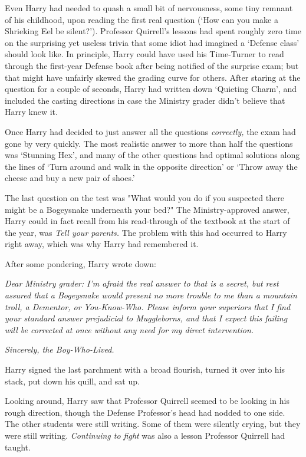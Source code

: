 Even Harry had needed to quash a small bit of nervousness, some tiny remnant of
his childhood, upon reading the first real question (`How can you make a
Shrieking Eel be silent?'). Professor Quirrell's lessons had spent roughly zero
time on the surprising yet useless trivia that some idiot had imagined a
`Defense class' should look like. In principle, Harry could have used his
Time-Turner to read through the first-year Defense book after being notified of
the surprise exam; but that might have unfairly skewed the grading curve for
others. After staring at the question for a couple of seconds, Harry had
written down `Quieting Charm', and included the casting directions in case the
Ministry grader didn't believe that Harry knew it.

Once Harry had decided to just answer all the questions \emph{correctly,} the
exam had gone by very quickly. The most realistic answer to more than half the
questions was `Stunning Hex', and many of the other questions had optimal
solutions along the lines of `Turn around and walk in the opposite direction'
or `Throw away the cheese and buy a new pair of shoes.'

The last question on the test was "What would you do if you suspected there
might be a Bogeysnake underneath your bed?" The Ministry-approved answer, Harry
could in fact recall from his read-through of the textbook at the start of the
year, was \emph{Tell your parents.} The problem with this had occurred to Harry
right away, which was why Harry had remembered it.

After some pondering, Harry wrote down:

\emph{Dear Ministry grader: I'm afraid the real answer to that is a secret, but
rest assured that a Bogeysnake would present no more trouble to me than a
mountain troll, a Dementor, or You-Know-Who. Please inform your superiors that
I find your standard answer prejudicial to Muggleborns, and that I expect this
failing will be corrected at once without any need for my direct intervention.}

\emph{Sincerely, the Boy-Who-Lived.}

Harry signed the last parchment with a broad flourish, turned it over into his
stack, put down his quill, and sat up.

Looking around, Harry saw that Professor Quirrell seemed to be looking in his
rough direction, though the Defense Professor's head had nodded to one side.
The other students were still writing. Some of them were silently crying, but
they were still writing. \emph{Continuing to fight} was also a lesson Professor
Quirrell had taught.

